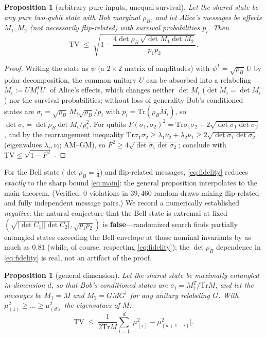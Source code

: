 \documentclass[11pt]{article}
\newtheorem{proposition}[theorem]{Proposition}
\theoremstyle{remark}
\newcommand{\TV}{\mathrm{TV}}
\newcommand{\Tr}{\mathrm{Tr}}
\begin{document}
\begin{proposition}[arbitrary pure inputs, unequal survival]
\label{prop:fidelity}
Let the shared state be any pure two-qubit state with Bob marginal
$\rho_B$, and let Alice's messages be effects $M_1,M_2$ (not
necessarily flip-related) with survival probabilities $p_i$. Then
\begin{equation}
\TV\;\le\;\sqrt{1-\frac{4\det\rho_B\,
\sqrt{\det M_1\det M_2}}{p_1p_2}} .
\label{eq:fidelity}
\end{equation}
\end{proposition}

\begin{proof}
Writing the state as $\psi$ (a $2\times2$ matrix of amplitudes)
with $\psi^{T}=\sqrt{\rho_B}\,U$ by polar decomposition, the common
unitary $U$ can be absorbed into a relabeling
$\tilde M_i:=UM_i^{T}U^{\dagger}$ of Alice's effects, which changes
neither $\det M_i$ ($\det\tilde M_i=\det M_i$) nor the survival
probabilities; without loss of generality Bob's conditioned states
are $\sigma_i=\sqrt{\rho_B}\,\tilde M_i\sqrt{\rho_B}/p_i$ with
$p_i=\Tr(\rho_B\tilde M_i)$, so
$\det\sigma_i=\det\rho_B\det M_i/p_i^{2}$. For qubits
$F(\sigma_1,\sigma_2)^{2}=\Tr\sigma_1\sigma_2
+2\sqrt{\det\sigma_1\det\sigma_2}$ \cite{QubitFidelity}, and by the
rearrangement inequality
$\Tr\sigma_1\sigma_2\ge\lambda_1\nu_2+\lambda_2\nu_1
\ge2\sqrt{\det\sigma_1\det\sigma_2}$ (eigenvalues
$\lambda_i,\nu_i$; AM--GM), so
$F^{2}\ge4\sqrt{\det\sigma_1\det\sigma_2}$; conclude with
$\TV\le\sqrt{1-F^{2}}$ \cite{FvdG1999}.
\end{proof}

For the Bell state ($\det\rho_B=\tfrac14$) and flip-related
messages, \eqref{eq:fidelity} reduces \emph{exactly} to the sharp
bound \eqref{eq:main}: the general proposition interpolates to the
main theorem. (Verified: $0$ violations in $39{,}460$ random draws
mixing flip-related and fully independent message pairs.) We record
a numerically established \emph{negative}: the
natural conjecture that the Bell state is extremal at fixed
$(\sqrt{|\det C_1||\det C_2|},\sqrt{p_1p_2})$ is \textbf{false}---randomized search
finds partially entangled states exceeding the Bell envelope at
those nominal invariants by as much as $0.81$ (while, of course,
respecting \eqref{eq:fidelity}); the $\det\rho_B$ dependence in
\eqref{eq:fidelity} is real, not an artifact of the proof.

\begin{proposition}[general dimension]
\label{prop:generald}
Let the shared state be maximally entangled in dimension $d$, so
that Bob's conditioned states are $\sigma_i=M_i^{T}/\Tr M$, and let
the messages be $M_1=M$ and $M_2=GMG^{\dagger}$ for any unitary
relabeling $G$. With $\mu^{2}_{(1)}\ge\dots\ge
\mu^{2}_{(d)}$ the eigenvalues of $M$:
\begin{equation}
\TV\;\le\;\frac{1}{2\Tr M}\sum_{i=1}^{d}
\bigl|\mu^{2}_{(i)}-\mu^{2}_{(d+1-i)}\bigr| .
\label{eq:generald}
\end{equation}
\end{proposition}
\end{document}
